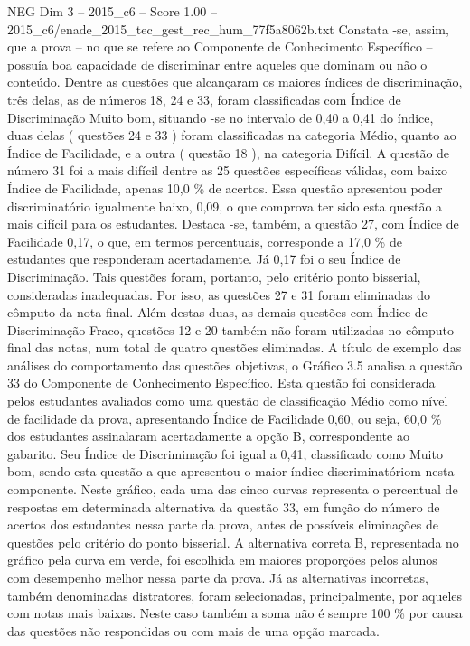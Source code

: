 \begin{textsample}{NEG Dim 3 – 2015\_c6 – Score 1.00 – 2015\_c6/enade\_2015\_tec\_gest\_rec\_hum\_77f5a8062b.txt}
Constata -se, assim, que a prova – no que se refere ao Componente de Conhecimento Específico – possuía boa capacidade de discriminar entre aqueles que dominam ou não o conteúdo.
Dentre as questões que alcançaram os maiores índices de discriminação, três delas, as de números 18, 24 e 33, foram classificadas com Índice de Discriminação Muito bom, situando -se no intervalo de 0,40 a 0,41 do índice, duas delas ( questões 24 e 33 ) foram classificadas na categoria Médio, quanto ao Índice de Facilidade, e a outra ( questão 18 ), na categoria Difícil.
A questão de número 31 foi a mais difícil dentre as 25 questões específicas válidas, com baixo Índice de Facilidade, apenas 10,0 \% de acertos.
Essa questão apresentou poder discriminatório igualmente baixo, 0,09, o que comprova ter sido esta questão a mais difícil para os estudantes.
Destaca -se, também, a questão 27, com Índice de Facilidade 0,17, o que, em termos percentuais, corresponde a 17,0 \% de estudantes que responderam acertadamente.
Já 0,17 foi o seu Índice de Discriminação.
Tais questões foram, portanto, pelo critério ponto bisserial, consideradas inadequadas.
Por isso, as questões 27 e 31 foram eliminadas do cômputo da nota final.
Além destas duas, as demais questões com Índice de Discriminação Fraco, questões 12 e 20 também não foram utilizadas no cômputo final das notas, num total de quatro questões eliminadas.
A título de exemplo das análises do comportamento das questões objetivas, o Gráfico 3.5 analisa a questão 33 do Componente de Conhecimento Específico.
Esta questão foi considerada pelos estudantes avaliados como uma questão de classificação Médio como nível de facilidade da prova, apresentando Índice de Facilidade 0,60, ou seja, 60,0 \% dos estudantes assinalaram acertadamente a opção B, correspondente ao gabarito.
Seu Índice de Discriminação foi igual a 0,41, classificado como Muito bom, sendo esta questão a que apresentou o maior índice discriminatóriom nesta componente.
Neste gráfico, cada uma das cinco curvas representa o percentual de respostas em determinada alternativa da questão 33, em função do número de acertos dos estudantes nessa parte da prova, antes de possíveis eliminações de questões pelo critério do ponto bisserial.
A alternativa correta B, representada no gráfico pela curva em verde, foi escolhida em maiores proporções pelos alunos com desempenho melhor nessa parte da prova.
Já as alternativas incorretas, também denominadas distratores, foram selecionadas, principalmente, por aqueles com notas mais baixas.
Neste caso também a soma não é sempre 100 \% por causa das questões não respondidas ou com mais de uma opção marcada.

\end{textsample}
